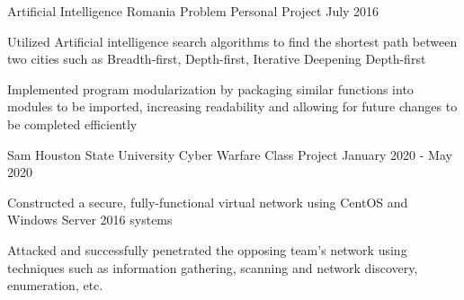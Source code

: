 
\begin{cventries}
	\cventry
	  {Artificial Intelligence} %
      {Romania Problem} %
      {Personal Project} %
	  {July 2016} %
	  {
	    \begin{cvitems} %
			\item {Utilized Artificial intelligence search algorithms to find the shortest path between two cities such as Breadth-first, Depth-first, Iterative Deepening Depth-first}
			\item{Implemented program modularization by packaging similar functions into modules to be imported, increasing readability and allowing for future changes to be completed efficiently}				
		\end{cvitems}
	  }


	\cventry
	  {Sam Houston State University} %
  	  {Cyber Warfare} %
	  {Class Project} %
	  {January 2020 - May 2020} %
	  {
	    \begin{cvitems} %
			\item {Constructed a secure, fully-functional virtual network using CentOS and Windows Server 2016 systems}
			\item {Attacked and successfully penetrated the opposing team’s network using techniques such as information gathering, scanning and network discovery, enumeration, etc.}
		\end{cvitems}
	  }


\end{cventries}
